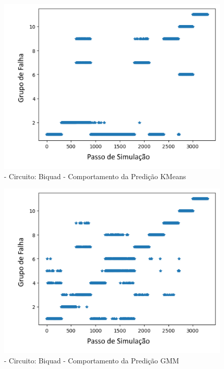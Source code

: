        
        
        \begin{figure}[H]
        \begin{center}
        \includegraphics[width=13cm]{./01_Pre_textuais/biquad_figs/KMeans_Biquad_Highpass_Filter_mc_+_4bitPRBS_[FALHA]raw.png}
        \caption{\label{fig:DecisionTreeClassifieSalenkey}- Circuito: Biquad - Comportamento da Predição KMeans }
        \end{center}
        \end{figure}
        
        \begin{figure}[H]
        \begin{center}
        \includegraphics[width=13cm]{./01_Pre_textuais/biquad_figs/GMM_Biquad_Highpass_Filter_mc_+_4bitPRBS_[FALHA]raw.png}
        \caption{\label{fig:DecisionTreeClassifieSalenkey}- Circuito: Biquad - Comportamento da Predição GMM }
        \end{center}
        \end{figure}
        

